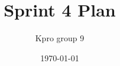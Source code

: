\documentclass[a4paper, 11pt]{report}
\title{Sprint 4 Plan}
\author{Kpro group 9}
\date{\today}
\begin{document}
\makeglossaries



\end{document}
